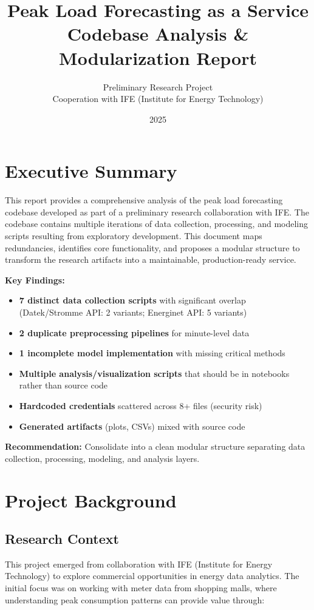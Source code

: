 \documentclass[11pt,a4paper]{article}
\title{\textbf{Peak Load Forecasting as a Service}\\
\large Codebase Analysis \& Modularization Report}
\author{Preliminary Research Project\\
Cooperation with IFE (Institute for Energy Technology)}
\date{2025}
\begin{document}
\maketitle

\section*{Executive Summary}

This report provides a comprehensive analysis of the peak load forecasting codebase developed as part of a preliminary research collaboration with IFE. The codebase contains multiple iterations of data collection, processing, and modeling scripts resulting from exploratory development. This document maps redundancies, identifies core functionality, and proposes a modular structure to transform the research artifacts into a maintainable, production-ready service.

\textbf{Key Findings:}
\begin{itemize}
    \item \textbf{7 distinct data collection scripts} with significant overlap (Datek/Stromme API: 2 variants; Energinet API: 5 variants)
    \item \textbf{2 duplicate preprocessing pipelines} for minute-level data
    \item \textbf{1 incomplete model implementation} with missing critical methods
    \item \textbf{Multiple analysis/visualization scripts} that should be in notebooks rather than source code
    \item \textbf{Hardcoded credentials} scattered across 8+ files (security risk)
    \item \textbf{Generated artifacts} (plots, CSVs) mixed with source code
\end{itemize}

\textbf{Recommendation:} Consolidate into a clean modular structure separating data collection, processing, modeling, and analysis layers.

\section{Project Background}

\subsection{Research Context}

This project emerged from collaboration with IFE (Institute for Energy Technology) to explore commercial opportunities in energy data analytics. The initial focus was on working with meter data from shopping malls, where understanding peak consumption patterns can provide value through:
\end{document}
